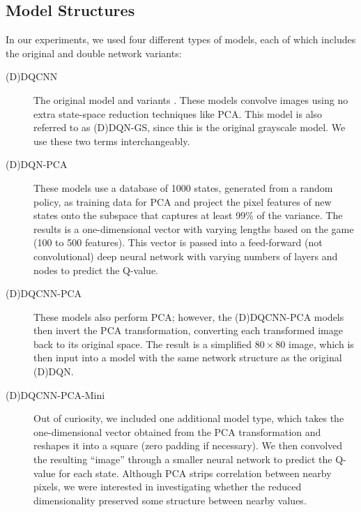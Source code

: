 \documentclass[11pt]{article}
\begin{document}
\subsection{Model Structures}
\label{subsec:model_structure}

In our experiments, we used four different types of models, each of which includes the original and double network variants: 

\begin{description}
    \item[(D)DQCNN] The original model \cite{mnih2013playing, mnih2015human} and variants \cite{van2016deep}. These models convolve images using no extra state-space reduction techniques like PCA. This model is also referred to as (D)DQN-GS, since this is the original grayscale model. We use these two terms interchangeably.
    
    \item[(D)DQN-PCA] These models use a database of 1000 states, generated from a random policy, as training data for PCA and project the pixel features of new states onto the subspace that captures at least 99\% of the variance. The results is a one-dimensional vector with varying lengths based on the game (100 to 500 features). This vector is passed into a feed-forward (not convolutional) deep neural network with varying numbers of layers and nodes to predict the Q-value.
    
    \item[(D)DQCNN-PCA] These models also perform PCA; however, the (D)DQCNN-PCA models then invert the PCA transformation, converting each transformed image back to its original space. The result is a simplified $80 \times 80$ image, which is then input into a model with the same network structure as the original (D)DQN.
    
    \item[(D)DQCNN-PCA-Mini] Out of curiosity, we included one additional model type, which takes the one-dimensional vector obtained from the PCA transformation and reshapes it into a square (zero padding if necessary). We then convolved the resulting ``image'' through a smaller neural network to predict the Q-value for each state. Although PCA strips correlation between nearby pixels, we were interested in investigating whether the reduced dimensionality preserved some structure between nearby values.
\end{description}
\end{document}
